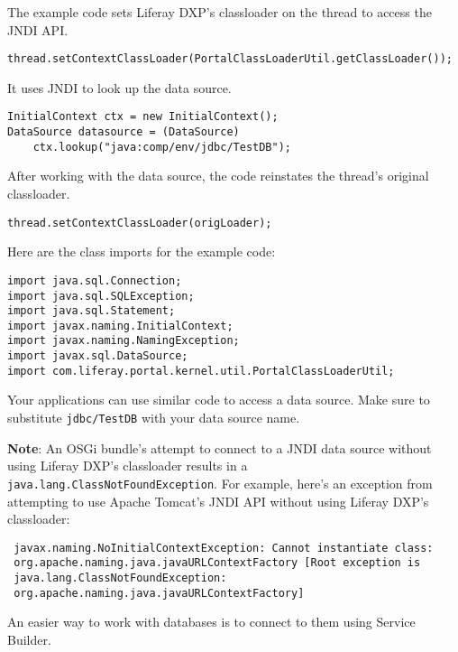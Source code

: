 The example code sets Liferay DXP's classloader on the thread to access
the JNDI API.

\begin{verbatim}
thread.setContextClassLoader(PortalClassLoaderUtil.getClassLoader());
\end{verbatim}

It uses JNDI to look up the data source.

\begin{verbatim}
InitialContext ctx = new InitialContext();
DataSource datasource = (DataSource)
    ctx.lookup("java:comp/env/jdbc/TestDB"); 
\end{verbatim}

After working with the data source, the code reinstates the thread's
original classloader.

\begin{verbatim}
thread.setContextClassLoader(origLoader);
\end{verbatim}

Here are the class imports for the example code:

\begin{verbatim}
import java.sql.Connection;
import java.sql.SQLException;
import java.sql.Statement;
import javax.naming.InitialContext;
import javax.naming.NamingException;
import javax.sql.DataSource;
import com.liferay.portal.kernel.util.PortalClassLoaderUtil;
\end{verbatim}

Your applications can use similar code to access a data source. Make
sure to substitute \texttt{jdbc/TestDB} with your data source name.

\noindent\hrulefill

\textbf{Note}: An OSGi bundle's attempt to connect to a JNDI data source
without using Liferay DXP's classloader results in a
\texttt{java.lang.ClassNotFoundException}. For example, here's an
exception from attempting to use Apache Tomcat's JNDI API without using
Liferay DXP's classloader:

\begin{verbatim}
 javax.naming.NoInitialContextException: Cannot instantiate class:
 org.apache.naming.java.javaURLContextFactory [Root exception is
 java.lang.ClassNotFoundException:
 org.apache.naming.java.javaURLContextFactory]
\end{verbatim}

\noindent\hrulefill

An easier way to work with databases is to connect to them using Service
Builder.

